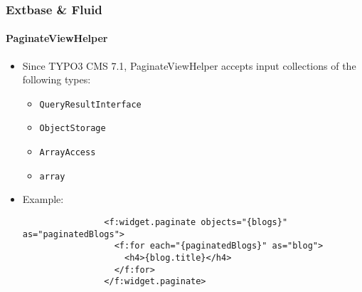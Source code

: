 %

\begin{frame}[fragile]
	\frametitle{Extbase \& Fluid}
	\framesubtitle{PaginateViewHelper}

	\begin{itemize}

		\item Since TYPO3 CMS 7.1, PaginateViewHelper accepts input collections of the following types:

			\begin{itemize}
				\item \texttt{QueryResultInterface}
				\item \texttt{ObjectStorage}
				\item \texttt{ArrayAccess}
				\item \texttt{array}
			\end{itemize}

		\item Example:

			\begin{lstlisting}
				<f:widget.paginate objects="{blogs}" as="paginatedBlogs">
				  <f:for each="{paginatedBlogs}" as="blog">
				    <h4>{blog.title}</h4>
				  </f:for>
				</f:widget.paginate>
			\end{lstlisting}

	\end{itemize}

\end{frame}


